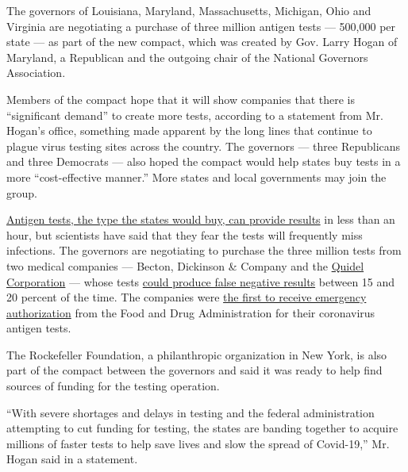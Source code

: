 The governors of Louisiana, Maryland, Massachusetts, Michigan, Ohio and
Virginia are negotiating a purchase of three million antigen tests ---
500,000 per state --- as part of the new compact, which was created by
Gov. Larry Hogan of Maryland, a Republican and the outgoing chair of the
National Governors Association.

Members of the compact hope that it will show companies that there is
``significant demand'' to create more tests, according to a statement
from Mr. Hogan's office, something made apparent by the long lines that
continue to plague virus testing sites across the country. The governors
--- three Republicans and three Democrats --- also hoped the compact
would help states buy tests in a more ``cost-effective manner.'' More
states and local governments may join the group.

\href{https://www.nytimes.com/2020/07/06/health/fast-coronavirus-tests.html}{Antigen
tests, the type the states would buy, can provide results} in less than
an hour, but scientists have said that they fear the tests will
frequently miss infections. The governors are negotiating to purchase
the three million tests from two medical companies --- Becton, Dickinson
\& Company and the
\href{https://www.nytimes.com/2020/05/09/health/antigen-testing-fda-coronavirus.html}{Quidel
Corporation} --- whose tests
\href{https://www.nytimes.com/2020/07/06/health/fast-coronavirus-tests.html}{could
produce false negative results} between 15 and 20 percent of the time.
The companies were
\href{https://www.nytimes.com/2020/07/06/health/fast-coronavirus-tests.html}{the
first to receive emergency authorization} from the Food and Drug
Administration for their coronavirus antigen tests.

The Rockefeller Foundation, a philanthropic organization in New York, is
also part of the compact between the governors and said it was ready to
help find sources of funding for the testing operation.

``With severe shortages and delays in testing and the federal
administration attempting to cut funding for testing, the states are
banding together to acquire millions of faster tests to help save lives
and slow the spread of Covid-19,'' Mr. Hogan said in a statement.

